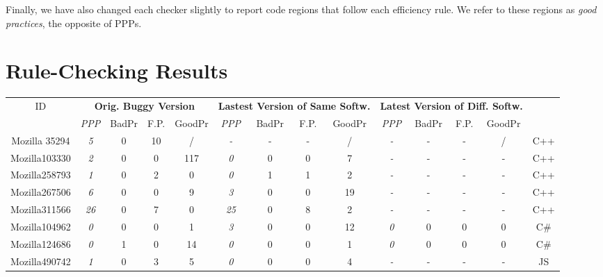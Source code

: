 Finally, we have also changed each checker slightly to report
code regions that follow each efficiency rule. We refer to these regions as 
{\it good practices}, the opposite of PPPs. 

\section{Rule-Checking Results}
\label{sec:4_detection_results}

\begin{table}[tb!]
\scriptsize
\centering
\begin{adjustwidth}{-.75in}{-.75in}
{
\begin{tabular}{cccccccccccccc}
\toprule
ID	    & \multicolumn{4}{c}{\bf Orig. Buggy Version} & \multicolumn{4}{c}{\bf Lastest Version of Same Softw.} & \multicolumn{4}{c}{\bf Latest Version of Diff. Softw.}& \\
\cmidrule(lr){2-5}
\cmidrule(lr){6-9}
\cmidrule(lr){10-13}
	       & {\it PPP}    &BadPr & F.P.&GoodPr  &  {\it PPP}   &BadPr & F.P.&GoodPr  & {\it PPP}   &BadPr & F.P.&GoodPr  & \\
\midrule
Mozilla 35294  & {\it  5}     & 0      & 10     & /      & {\it - }     & -      & -      & /      & {\it -  }    & -      & -      & /      & C++	\\ 
Mozilla103330  & {\it  2}     & 0      & 0      & 117    & {\it 0 }     & 0      & 0      & 7      & {\it -  }    & -      & -      & -      & C++	\\ 
Mozilla258793  & {\it  1}     & 0      & 2      & 0      & {\it 0 }     & 1      & 1      & 2      & {\it -  }    & -      & -      & -      & C++	\\
Mozilla267506  & {\it  6}     & 0      & 0      & 9      & {\it 3 }     & 0      & 0      & 19     & {\it -  }    & -      & -      & -      & C++	\\
Mozilla311566  & {\it 26}     & 0      & 7      & 0      & {\it 25}     & 0      & 8      & 2      & {\it -  }    & -      & -      & -      & C++	\\
Mozilla104962  & {\it  0}     & 0      & 0      & 1      & {\it 3 }     & 0      & 0      & 12     & {\it 0  }    & 0      & 0      & 0      & C\#	\\
Mozilla124686  & {\it  0}     & 1      & 0      & 14     & {\it 0 }     & 0      & 0      & 1      & {\it 0  }    & 0      & 0      & 0      & C\#	\\ 
Mozilla490742  & {\it  1}     & 0      & 3      & 5      & {\it 0 }     & 0      & 0      & 4      & {\it -  }    & -      & -      & -      & JS	\\

\end{tabular}}
\end{adjustwidth}
\end{table}
